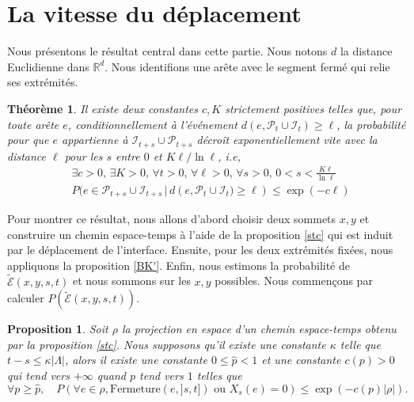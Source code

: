 \documentclass[titlepage,a4paper,12pt]{article}
\newcounter{th}
\newcounter{propo}
\newtheorem{thm}[th]{Théorème}
\newtheorem{prop}[propo]{Proposition}
\begin{document}
\section{La vitesse du déplacement}
Nous présentons le résultat central dans cette partie. Nous notons $d$ la distance Euclidienne dans $\mathbb{R}^d$. Nous identifions une arête avec le segment fermé qui relie ses extrémités.
\begin{thm}\label{vitesse}
Il existe deux constantes $c,K$ strictement positives telles que, pour toute arête $e$, conditionnellement à l'événement $d(e,\mathcal{P}_t\cup\mathcal{I}_t)\geqslant \ell$, la probabilité pour que $e$ appartienne à $\mathcal{I}_{t+s}\cup \mathcal{P}_{t+s}$ décroît exponentiellement vite avec la distance $\ell$ pour les $s$ entre $0$ et $K\ell / \ln \ell$, i.e,
\begin{align*}
&\exists c > 0,\,\exists K > 0,\, \forall t>0,\, \forall \ell> 0,\,\forall s> 0,\, 0< s< \frac{K\ell}{\ln \ell}\\ &P\big(e\in \mathcal{P}_{t+s}\cup \mathcal{I}_{t+s}\,\big|\,d(e,\mathcal{P}_t\cup \mathcal{I}_t\big) \geqslant \ell)\leqslant \exp(-c\ell)
\end{align*}
\end{thm}
Pour montrer ce résultat, nous allons d'abord choisir deux sommets $x,y$ et construire un chemin espace-temps à l'aide de la proposition \ref{stc} qui est induit par le déplacement de l'interface. Ensuite, pour les deux extrémités fixées, nous appliquons la proposition \ref{BK'}. Enfin, nous estimons la probabilité de $\widetilde{\mathcal{E}}(x,y,s,t)$ et nous sommons sur les $x,y$ possibles. Nous commençons par calculer $P(\widetilde{\mathcal{E}}(x,y,s,t))$. 
\begin{prop} \label{decexp}
Soit $\rho$ la projection en espace d'un chemin espace-temps obtenu par la proposition \ref{stc}. Nous supposons qu'il existe une constante $\kappa$ telle que $t-s \leqslant \kappa |\Lambda|$, alors il existe une constante $0\leqslant\widehat{p}< 1$ et une constante $c(p)>0$ qui tend vers $+\infty$ quand $p$ tend vers $1$ telles que $$\forall p \geqslant \widehat{p}, \quad P\left(\forall e\in \rho, \mathrm{Fermeture}(e,]s,t]) \text{ ou }X_s(e) = 0\right)\leqslant \exp(-c(p)|\rho|).$$
\end{prop}
\end{document}
